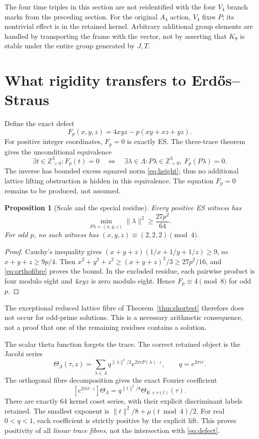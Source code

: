\documentclass[11pt,reqno]{amsart}
\newtheorem{proposition}[theorem]{Proposition}
\theoremstyle{definition}\newtheorem{definition}[theorem]{Definition}
\theoremstyle{remark}\newtheorem{remark}[theorem]{Remark}
\newcommand{\Z}{\mathbb Z}\newcommand{\Q}{\mathbb Q}\newcommand{\R}{\mathbb R}\newcommand{\F}{\mathbb F}
\newcommand{\La}{\Lambda}\newcommand{\tr}{\operatorname{tr}}\newcommand{\Span}{\operatorname{span}}
\begin{document}
The four time triples in this section are not reidentified with the four $V_4$ branch marks from the preceding section. For the original $A_4$ action, $V_4$ fixes $P$; its nontrivial effect is in the retained kernel. Arbitrary additional group elements are handled by transporting the frame with the vector, not by asserting that $K_9$ is stable under the entire group generated by $J,T$.

\section{What rigidity transfers to Erd\H{o}s--Straus}
Define the exact defect
\begin{equation}\label{eq:defect}
F_p(x,y,z)=4xyz-p(xy+xz+yz).
\end{equation}
For positive integer coordinates, $F_p=0$ is exactly ES. The three-trace theorem gives the unconditional equivalence
\[
\exists t\in\Z_{>0}^3:F_p(t)=0
\quad\Longleftrightarrow\quad
\exists\lambda\in\La:P\lambda\in\Z_{>0}^3,\ F_p(P\lambda)=0.
\]
The inverse has bounded excess squared norm \eqref{eq:height}; thus no additional lattice lifting obstruction is hidden in this equivalence. The equation $F_p=0$ remains to be produced, not assumed.

\begin{proposition}[Scale and the special residue]
Every positive ES witness has
\[
\min_{P\lambda=(x,y,z)}\|\lambda\|^2\ge\frac{27p^2}{64}.
\]
For odd $p$, no such witness has $(x,y,z)\equiv(2,2,2)\pmod4$.
\end{proposition}
\begin{proof}
Cauchy's inequality gives $(x+y+z)(1/x+1/y+1/z)\ge9$, so $x+y+z\ge9p/4$. Then $x^2+y^2+z^2\ge(x+y+z)^2/3\ge27p^2/16$, and \eqref{eq:orthofibre} proves the bound. In the excluded residue, each pairwise product is four modulo eight and $4xyz$ is zero modulo eight. Hence $F_p\equiv4\pmod8$ for odd $p$.
\end{proof}
The exceptional reduced lattice fibre of Theorem~\ref{thm:shortest} therefore does not occur for odd-prime solutions. This is a necessary arithmetic consequence, not a proof that one of the remaining residues contains a solution.

The scalar theta function forgets the trace. The correct retained object is the Jacobi series
\[
\Theta_\La(\tau,z)=\sum_{\lambda\in\La}q^{\|\lambda\|^2/2}
 e^{2\pi iP(\lambda)\cdot z},\qquad q=e^{2\pi i\tau}.
\]
The orthogonal fibre decomposition gives the exact Fourier coefficient
\begin{equation}\label{eq:theta}
[e^{2\pi it\cdot z}]\Theta_\La
=q^{\|t\|^2/8}\Theta_{K+r(t)}(\tau).
\end{equation}
There are exactly 64 kernel coset series, with their explicit discriminant labels retained. The smallest exponent is $\|t\|^2/8+\mu(t\bmod4)/2$. For real $0<q<1$, each coefficient is strictly positive by the explicit lift. This proves positivity of all \emph{linear trace fibres}, not the intersection with \eqref{eq:defect}.
\end{document}
